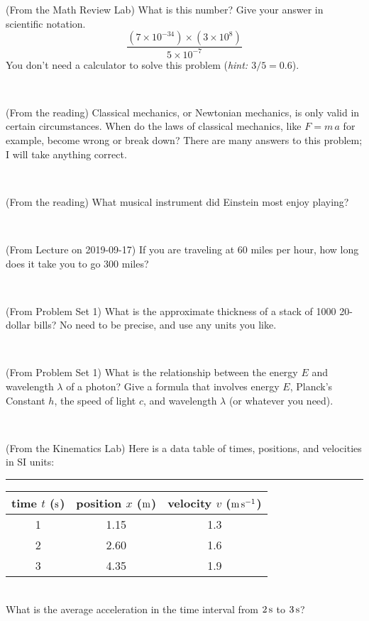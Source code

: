 \documentclass[12pt, letterpaper]{article}
\begin{document}
\begin{problem} (From the Math Review Lab)
What is this number? Give your answer in scientific notation.
$$
\frac{(7\times10^{-34})\times(3\times10^8)}{5\times10^{-7}}
$$
You don't need a calculator to solve this problem (\textit{hint: $3/5=0.6$}).
\end{problem}


\vfill ~

\begin{problem} (From the reading)
Classical mechanics, or Newtonian mechanics, is only valid in certain
circumstances. When do the laws of classical mechanics, like $F =
m\,a$ for example, become wrong or break down? There are many answers
to this problem; I will take anything correct.
\end{problem}


\vfill ~

\begin{problem} (From the reading)
What musical instrument did Einstein most enjoy playing?
\end{problem}


\vfill ~

\begin{problem} (From Lecture on 2019-09-17)
If you are traveling at 60 miles per hour, how long does
it take you to go 300 miles?
\end{problem}


\vfill ~


\clearpage


\begin{problem} (From Problem Set 1)
What is the approximate thickness of a stack of 1000 20-dollar bills?
No need to be precise, and use any units you like.
\end{problem}


\vfill ~

\begin{problem} (From Problem Set 1)
What is the relationship between the energy $E$ and wavelength
$\lambda$ of a photon? Give a formula that involves energy $E$,
Planck's Constant $h$, the speed of light $c$, and wavelength
$\lambda$ (or whatever you need).
\end{problem}

\vfill ~

\begin{problem} (From the Kinematics Lab)
Here is a data table of times, positions, and velocities in SI units:\\
\rule{1.0in}{0pt}\begin{tabular}{c|c|c}
time $t$ ($\mathrm{s}$) & position $x$ ($\mathrm{m}$) & velocity $v$ ($\mathrm{m}\,\mathrm{s}^{-1}$) \\
\hline
1 & 1.15 & 1.3 \\
2 & 2.60 & 1.6 \\
3 & 4.35 & 1.9 \\
\hline
\end{tabular}\\
What is the average acceleration in the time interval from $2\,\mathrm{s}$ to $3\,\mathrm{s}$?
\end{problem}
\end{document}
